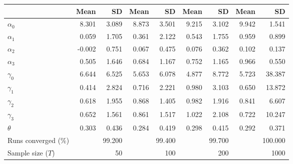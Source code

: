 
\begin{tabular}[t]{lrrrrrrrr}
\toprule
  & Mean & SD & Mean  & SD  & Mean   & SD   & Mean    & SD   \\
\midrule
$\alpha_{0}$ & 8.301 & 3.089 & 8.873 & 3.501 & 9.215 & 3.102 & 9.942 & 1.541\\
$\alpha_{1}$ & 0.059 & 1.705 & 0.361 & 2.122 & 0.543 & 1.755 & 0.959 & 0.899\\
$\alpha_{2}$ & -0.002 & 0.751 & 0.067 & 0.475 & 0.076 & 0.362 & 0.102 & 0.137\\
$\alpha_{3}$ & 0.505 & 1.646 & 0.684 & 1.167 & 0.752 & 1.165 & 0.966 & 0.550\\
$\gamma_{0}$ & 6.644 & 6.525 & 5.653 & 6.078 & 4.877 & 8.772 & 5.723 & 38.387\\
$\gamma_{1}$ & 0.414 & 2.824 & 0.716 & 2.221 & 0.980 & 3.103 & 0.650 & 13.872\\
$\gamma_{2}$ & 0.618 & 1.955 & 0.868 & 1.405 & 0.982 & 1.916 & 0.841 & 6.607\\
$\gamma_{3}$ & 0.652 & 1.561 & 0.861 & 1.517 & 1.022 & 2.108 & 0.722 & 10.247\\
$\theta$ & 0.303 & 0.436 & 0.284 & 0.419 & 0.298 & 0.415 & 0.292 & 0.371\\
Runs converged (\%) &  & 99.200 &  & 99.400 &  & 99.700 &  & 100.000\\
Sample size ($T$) &  & 50 &  & 100 &  & 200 &  & 1000\\
\bottomrule
\end{tabular}
